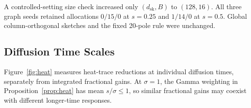 \documentclass[conference]{IEEEtran}
\theoremstyle{definition}
\newcommand{\dsk}{d_{\mathrm{sk}}}
\begin{document}
A controlled-setting size check increased only $(\dsk,B)$ to
$(128,16)$. All three graph seeds retained allocations $0/15/0$
at $s=0.25$ and $1/14/0$ at $s=0.5$. Global column-orthogonal
sketches and the fixed 20-pole rule were unchanged.

\subsection{Diffusion Time Scales}
\label{sec:exp-heat}

Figure~\ref{fig:heat} measures heat-trace reductions at individual
diffusion times, separately from integrated fractional gains. At
$\sigma=1$, the Gamma weighting in Proposition~\ref{prop:heat} has mean
$s/\sigma\le1$, so similar fractional gains may coexist with different
longer-time responses.
\end{document}
